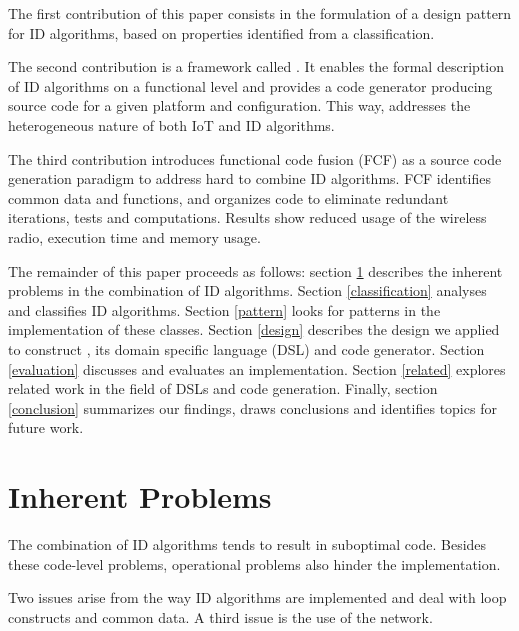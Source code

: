 \documentclass[conference]{IEEEtran}
\begin{document}

The first contribution of this paper consists in the formulation of a design
pattern for ID algorithms, based on properties identified from a classification.


The second contribution is a framework called \NAME. It enables the formal
description of ID algorithms on a functional level and provides a code
generator producing source code for a given platform and configuration. This
way, \NAME addresses the heterogeneous nature of both IoT and ID algorithms.


The third contribution introduces functional code fusion (FCF) as a source code
generation paradigm to address hard to combine ID algorithms. FCF identifies
common data and functions, and organizes code to eliminate redundant
iterations, tests and computations. Results show reduced usage of the wireless
radio, execution time and memory usage.


The remainder of this paper proceeds as follows: section \ref{problems}
describes the inherent problems in the combination of ID algorithms. Section
\ref{classification} analyses and classifies ID algorithms. Section
\ref{pattern} looks for patterns in the implementation of these classes.
Section \ref{design} describes the design we applied to construct \NAME, its
domain specific language (DSL) and code generator. Section \ref{evaluation}
discusses and evaluates an implementation. Section \ref{related} explores
related work in the field of DSLs and code generation. Finally, section
\ref{conclusion} summarizes our findings, draws conclusions and identifies
topics for future work.

\section{Inherent Problems}
\label{problems}

The combination of ID algorithms tends to result in suboptimal code. Besides
these code-level problems, operational problems also hinder the implementation.

Two issues arise from the way ID algorithms are implemented and deal with loop
constructs and common data. A third issue is the use of the network.
\end{document}
